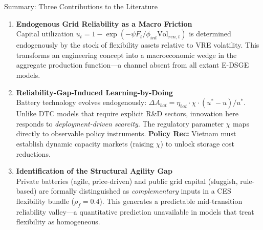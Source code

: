 \documentclass[aspectratio=169,10pt]{beamer}
\begin{document}
\begin{frame}{Summary: Three Contributions to the Literature}
  \begin{enumerate}
    \item \textbf{Endogenous Grid Reliability as a Macro Friction}\\[2pt]
    {\small Capital utilization $u_t = 1-\exp(-\psi F_t/\phi_{int}\mathrm{Vol}_{ren,t})$ is determined endogenously by the stock of flexibility assets relative to VRE volatility. This transforms an engineering concept into a macroeconomic wedge in the aggregate production function---a channel absent from all extant E-DSGE models.}
    \medskip

    \item \textbf{Reliability-Gap-Induced Learning-by-Doing}\\[2pt]
    {\small Battery technology evolves endogenously: $\Delta A_{bat} = \eta_{bat}\cdot\chi\cdot(u^*-u)/u^*$. Unlike DTC models that require explicit R\&D sectors, innovation here responds to \textit{deployment-driven scarcity}. The regulatory parameter $\chi$ maps directly to observable policy instruments. \textbf{Policy Rec:} Vietnam must establish dynamic capacity markets (raising $\chi$) to unlock storage cost reductions.}
    \medskip

    \item \textbf{Identification of the Structural Agility Gap}\\[2pt]
    {\small Private batteries (agile, price-driven) and public grid capital (sluggish, rule-based) are formally distinguished as \textit{complementary} inputs in a CES flexibility bundle ($\rho_f=0.4$). This generates a predictable mid-transition reliability valley---a quantitative prediction unavailable in models that treat flexibility as homogeneous.}
  \end{enumerate}
\end{frame}
\end{document}
